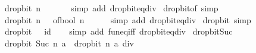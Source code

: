 \begin{isabellebody}
\ \ {\isachardoublequoteopen}drop{\isacharunderscore}{\kern0pt}bit\ n\ {}\ {\isacharequal}{\kern0pt}\ {}{\isachardoublequoteclose}\isanewline
%
\isadelimproof
\ \ %
\endisadelimproof
%
\isatagproof
{}\isamarkupfalse%
\ {\isacharparenleft}{\kern0pt}simp\ add{\isacharcolon}{\kern0pt}\ drop{\isacharunderscore}{\kern0pt}bit{\isacharunderscore}{\kern0pt}eq{\isacharunderscore}{\kern0pt}div{\isacharparenright}{\kern0pt}%
\endisatagproof
{\isafoldproof}%
%
\isadelimproof
\isanewline
%
\endisadelimproof
\isanewline
{}\isamarkupfalse%
\ drop{\isacharunderscore}{\kern0pt}bit{\isacharunderscore}{\kern0pt}of{\isacharunderscore}{\kern0pt}{}\ {\isacharbrackleft}{\kern0pt}simp{\isacharbrackright}{\kern0pt}{\isacharcolon}{\kern0pt}\isanewline
\ \ {\isachardoublequoteopen}drop{\isacharunderscore}{\kern0pt}bit\ n\ {}\ {\isacharequal}{\kern0pt}\ of{\isacharunderscore}{\kern0pt}bool\ {\isacharparenleft}{\kern0pt}n\ {\isacharequal}{\kern0pt}\ {}{\isacharparenright}{\kern0pt}{\isachardoublequoteclose}\isanewline
%
\isadelimproof
\ \ %
\endisadelimproof
%
\isatagproof
{}\isamarkupfalse%
\ {\isacharparenleft}{\kern0pt}simp\ add{\isacharcolon}{\kern0pt}\ drop{\isacharunderscore}{\kern0pt}bit{\isacharunderscore}{\kern0pt}eq{\isacharunderscore}{\kern0pt}div{\isacharparenright}{\kern0pt}%
\endisatagproof
{\isafoldproof}%
%
\isadelimproof
\isanewline
%
\endisadelimproof
\isanewline
{}\isamarkupfalse%
\ drop{\isacharunderscore}{\kern0pt}bit{\isacharunderscore}{\kern0pt}{}\ {\isacharbrackleft}{\kern0pt}simp{\isacharbrackright}{\kern0pt}{\isacharcolon}{\kern0pt}\isanewline
\ \ {\isachardoublequoteopen}drop{\isacharunderscore}{\kern0pt}bit\ {}\ {\isacharequal}{\kern0pt}\ id{\isachardoublequoteclose}\isanewline
%
\isadelimproof
\ \ %
\endisadelimproof
%
\isatagproof
{}\isamarkupfalse%
\ {\isacharparenleft}{\kern0pt}simp\ add{\isacharcolon}{\kern0pt}\ fun{\isacharunderscore}{\kern0pt}eq{\isacharunderscore}{\kern0pt}iff\ drop{\isacharunderscore}{\kern0pt}bit{\isacharunderscore}{\kern0pt}eq{\isacharunderscore}{\kern0pt}div{\isacharparenright}{\kern0pt}%
\endisatagproof
{\isafoldproof}%
%
\isadelimproof
\isanewline
%
\endisadelimproof
\isanewline
{}\isamarkupfalse%
\ drop{\isacharunderscore}{\kern0pt}bit{\isacharunderscore}{\kern0pt}Suc{\isacharcolon}{\kern0pt}\isanewline
\ \ {\isachardoublequoteopen}drop{\isacharunderscore}{\kern0pt}bit\ {\isacharparenleft}{\kern0pt}Suc\ n{\isacharparenright}{\kern0pt}\ a\ {\isacharequal}{\kern0pt}\ drop{\isacharunderscore}{\kern0pt}bit\ n\ {\isacharparenleft}{\kern0pt}a\ div\ {}{\isacharparenright}{\kern0pt}{\isachardoublequoteclose}\isanewline

\end{isabellebody}
